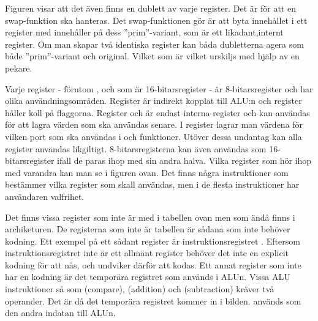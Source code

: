 \documentclass[main.tex]{subfiles}
\begin{document}
Figuren visar att det även finns en dublett av varje register. Det är för att
en swap-funktion ska hanteras. Det swap-funktionen gör är att byta innehållet i
ett register med innehåller på dess ''prim''-variant, som är ett
likadant,internt register. Om man skapar två identiska register kan båda
dubletterna agera som både ''prim''-variant och original. Vilket som är vilket
urskiljs med hjälp av en pekare.

Varje register - förutom ,  och  som är
16-bitarsregister - är 8-bitarsregister och har olika användningsområden.
Register  är indirekt kopplat till ALU:n och register  håller
koll på flaggorna. Register  och  är endast interna register
och kan användas för att lagra värden som ska användas senare. I register
 lagrar man värdena för vilken port som ska användas i  och
 funktioner. Utöver dessa undantag kan alla register användas
likgiltigt. 8-bitarsregisterna kan även användas som 16-bitarsregister ifall de
paras ihop med sin andra halva. Vilka register som hör ihop med varandra kan
man se i figuren ovan. Det finns några instruktioner som bestämmer vilka
register som skall användas, men i de flesta instruktioner har användaren
valfrihet.

Det finns vissa register som inte är med i tabellen ovan men som ändå finns i
archiketuren. De registerna som inte är tabellen är sådana som inte behöver
kodning. Ett exempel på ett sådant register är instruktionsregistret .
Eftersom instruktionsregistret inte är ett allmänt register behöver det inte en
explicit kodning för att nås, och undviker därför att kodas. Ett annat register
som inte har en kodning är det temporära registret som används i ALUn.  Vissa
ALU instruktioner så som  (compare),  (addition) och
 (subtraction) kräver två operander. Det är då det temporära
registret  kommer in i bilden.  används som den andra
indatan till ALUn.
\end{document}
